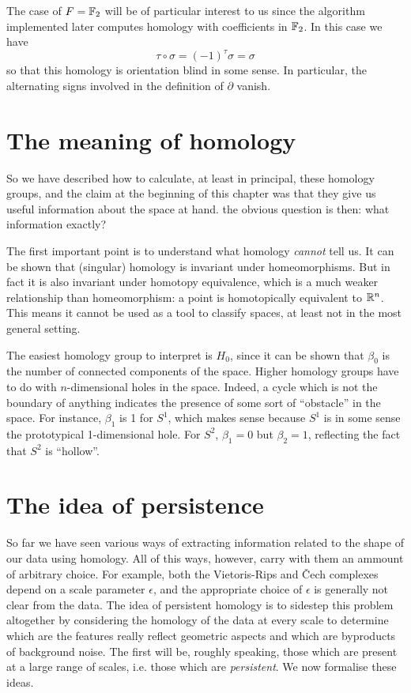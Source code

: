 \documentclass[../main.tex]{subfiles}
\begin{document}
The case of \( F = \mathbb{F}_2 \) will be of particular interest to us since the algorithm
implemented later computes homology with coefficients in \( \mathbb{F}_2 \). In this case we have
\begin{equation*}
	\tau \circ \sigma = (-1)^\tau \sigma = \sigma
\end{equation*}
so that this homology is orientation blind in some sense. In particular, the alternating
signs involved in the definition of \( \partial \) vanish. 

\section{The meaning of homology}\label{sec:meaning}
So we have described how to calculate, at least in principal, these homology groups, and
the claim at the beginning of this chapter was that they give us useful information about
the space at hand. the obvious question is then: what information exactly?

The first important point is to understand what homology \emph{cannot} tell us. It can be
shown that (singular) homology is invariant under homeomorphisms. But in fact it is also
invariant under homotopy equivalence, which is a much weaker relationship than
homeomorphism: a point is homotopically equivalent to \( \mathbb{R}^n \). This means it cannot be
used as a tool to classify spaces, at least not in the most general setting. 

The easiest homology group to interpret is \( H_0 \), since it can be shown that \(
\beta_0 \) is the number of connected components of the space. Higher homology groups
have to do with \( n \)-dimensional holes in the space.  Indeed, a cycle which is not the
boundary of anything indicates the presence of some sort of ``obstacle'' in the space. For
instance, \( \beta_1 \) is 1 for \( S^1 \), which makes sense because \( S^1 \) is in some
sense the prototypical 1-dimensional hole. For \( S^2 \), \( \beta_1 = 0 \) but \( \beta_2
= 1 \), reflecting the fact that \( S^2 \) is ``hollow''. 

\section{The idea of persistence}\label{sec:persistence}
So far we have seen various ways of extracting information related to the shape of our
data using homology. All of this ways, however, carry with them an ammount of arbitrary
choice. For example, both the Vietoris-Rips and Čech complexes depend on a scale parameter
\( \epsilon \), and the appropriate choice of \( \epsilon \) is generally not clear from
the data. The idea of persistent homology is to sidestep this problem altogether by
considering the homology of the data at every scale to determine which are the features
really reflect geometric aspects and which are byproducts of background noise. The first
will be, roughly speaking, those which are present at a large range of scales, i.e. those
which are \emph{persistent}. We now formalise these ideas.
\end{document}
